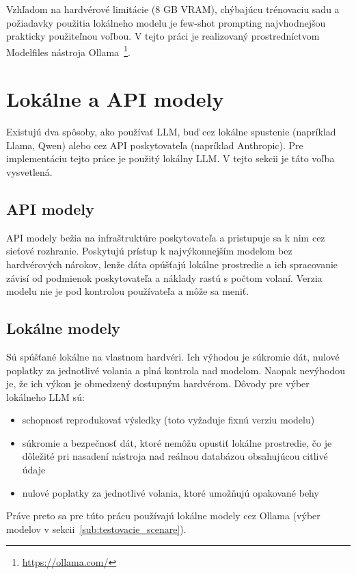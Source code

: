 Vzhľadom na hardvérové limitácie (8 GB VRAM), chýbajúcu trénovaciu sadu a požiadavky použitia lokálneho modelu je few-shot prompting najvhodnejšou prakticky použiteľnou voľbou. V tejto práci je realizovaný prostredníctvom Modelfiles nástroja Ollama~\footnote{\url{https://ollama.com/}}.

\section{Lokálne a API modely}
\label{sub:lokal_api_modely}
Existujú dva spôsoby, ako používať LLM, buď cez lokálne spustenie (napríklad Llama, Qwen) alebo cez API poskytovateľa (napríklad Anthropic). Pre implementáciu tejto práce je použitý lokálny LLM. V tejto sekcii je táto voľba vysvetlená.

\subsection{API modely}

API modely bežia na infraštruktúre poskytovateľa a pristupuje sa k nim cez sieťové rozhranie. Poskytujú prístup k najvýkonnejším modelom bez hardvérových nárokov, lenže dáta opúšťajú lokálne prostredie a ich spracovanie závisí od podmienok poskytovateľa a náklady rastú s počtom volaní. Verzia modelu nie je pod kontrolou používateľa a  môže sa meniť.

\subsection{Lokálne modely}

Sú spúšťané lokálne na vlastnom hardvéri. Ich výhodou je súkromie dát, nulové poplatky za jednotlivé volania a plná kontrola nad modelom. Naopak nevýhodou je, že ich výkon je obmedzený dostupným hardvérom. Dôvody pre výber lokálneho LLM sú:

\begin{itemize}
    \item schopnosť reprodukovať výsledky (toto vyžaduje fixnú verziu modelu)
    \item súkromie a bezpečnosť dát, ktoré nemôžu opustiť lokálne prostredie, čo je dôležité pri nasadení nástroja nad reálnou databázou obsahujúcou citlivé údaje
    \item nulové poplatky za jednotlivé volania, ktoré umožňujú opakované behy
\end{itemize}

Práve preto sa pre túto prácu používajú lokálne modely cez Ollama (výber modelov v sekcii~\ref{sub:testovacie_scenare}).

